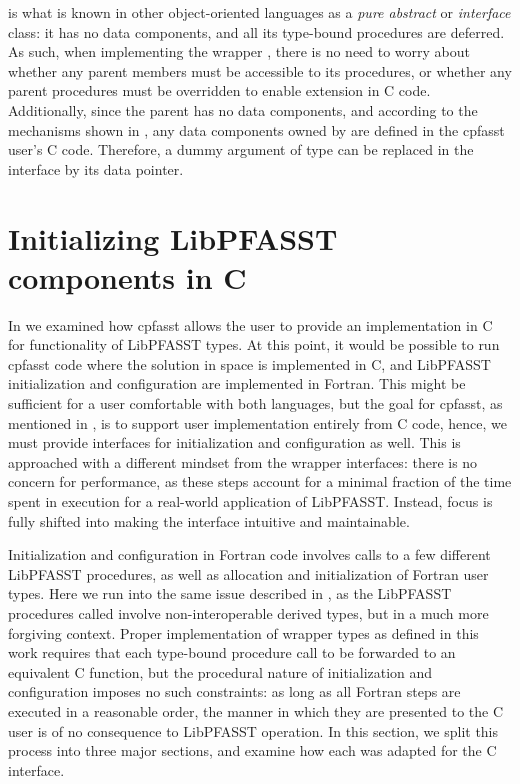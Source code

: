  is what is known in other object-oriented languages as a \textit{pure abstract} or \textit{interface} class: it has no data components, and all its type-bound procedures are deferred. As such, when implementing the wrapper , there is no need to worry about whether any parent members must be accessible to its procedures, or whether any parent procedures must be overridden to enable extension in C code. Additionally, since the parent has no data components, and according to the mechanisms shown in , any data components owned by  are defined in the cpfasst user's C code. Therefore, a dummy argument of type  can be replaced in the interface by its data pointer.

\section{Initializing LibPFASST components in C} \label{sec:impl_initializing}

In  we examined how cpfasst allows the user to provide an implementation in C for functionality of LibPFASST types. At this point, it would be possible to run cpfasst code where the solution in space is implemented in C, and LibPFASST initialization and configuration are implemented in Fortran. This might be sufficient for a user comfortable with both languages, but the goal for cpfasst, as mentioned in , is to support user implementation entirely from C code, hence, we must provide interfaces for initialization and configuration as well. This is approached with a different mindset from the wrapper interfaces: there is no concern for performance, as these steps account for a minimal fraction of the time spent in execution for a real-world application of LibPFASST. Instead, focus is fully shifted into making the interface intuitive and maintainable.

Initialization and configuration in Fortran code involves calls to a few different LibPFASST procedures, as well as allocation and initialization of Fortran user types. Here we run into the same issue described in , as the LibPFASST procedures called involve non-interoperable derived types, but in a much more forgiving context. Proper implementation of wrapper types as defined in this work requires that each type-bound procedure call to be forwarded to an equivalent C function, but the procedural nature of initialization and configuration imposes no such constraints: as long as all Fortran steps are executed in a reasonable order, the manner in which they are presented to the C user is of no consequence to LibPFASST operation. In this section, we split this process into three major sections, and examine how each was adapted for the C interface.

